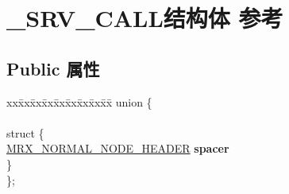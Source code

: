 \hypertarget{struct___s_r_v___c_a_l_l}{}\section{\+\_\+\+S\+R\+V\+\_\+\+C\+A\+L\+L结构体 参考}
\label{struct___s_r_v___c_a_l_l}
\subsection*{Public 属性}
\begin{DoxyCompactItemize}
\item 
\mbox{\label{struct___s_r_v___c_a_l_l_a9d83cc363d0358ee6721075636c050fa}} 
\begin{tabbing}
xx\=xx\=xx\=xx\=xx\=xx\=xx\=xx\=xx\=\kill
union \{\\
\\
\mbox{\label{union___s_r_v___c_a_l_l_1_1_0D1568_a92452f99800f1f937b41b6b56bbd6425}} 
\>struct \{\\
\>\>\hyperlink{struct___m_r_x___n_o_r_m_a_l___n_o_d_e___h_e_a_d_e_r}{MRX\_NORMAL\_NODE\_HEADER} {\bfseries spacer}\\
\>\} \\
\}; \\


\end{tabbing}
\end{DoxyCompactItemize}
